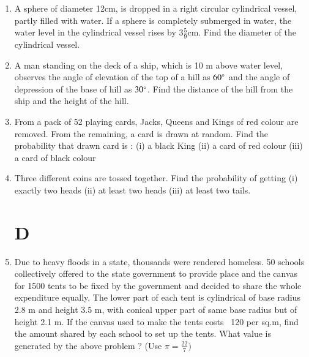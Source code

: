 \documentclass[book,11pt,onecolumn]{IEEEtran}
\begin{document}
\begin{enumerate}
\item  A sphere of diameter 12cm, is dropped in a right circular cylindrical vessel, partly filled with water. If a sphere is completely submerged in water, the water level in the cylindrical vessel rises by $ 3 \frac{5}{9}$cm. Find the diameter of the cylindrical vessel.\\  

\item  A man standing on the deck of a ship, which is 10 m above water level, observes the angle of elevation of the top of a hill as $ 60\degree $ and the angle of depression of the base of hill as $ 30 \degree $. Find the distance of the hill from the ship and the height of the hill.\\
\item From a pack of 52 playing cards, Jacks, Queens and Kings of red colour are removed. From the remaining, a card is drawn at random. Find the probability that drawn card is :
(i) a black King (ii) a card of red colour (iii) a card of black colour\\
\item  Three different coins are tossed together. Find the probability of getting (i) exactly two heads (ii) at least two heads (iii) at least two tails.\\

\section{\textbf{D}}  

\item  Due to heavy floods in a state, thousands were rendered homeless. 50 schools collectively offered to the state government to provide place and the canvas for 1500 tents to be fixed by the government and decided to share the whole expenditure equally. The lower part of each tent is cylindrical of base radius 2.8 m and height 3.5 m, with conical upper part of same base radius but of height 2.1 m. If the canvas used to make the tents costs \rupee~120 per sq.m, find the amount shared by each school to set up the tents. What value is generated by the above problem ? (Use $ \pi = \frac{22}{7} ) $\\
 

\end{enumerate}
\end{document}
